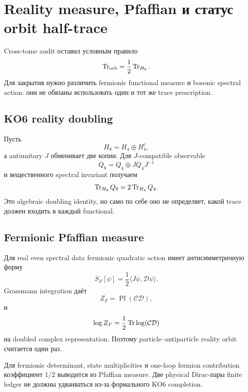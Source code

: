\chapter{Reality measure, Pfaffian и статус orbit half-trace}

Cross-tome audit оставил условным правило
\begin{equation}
 \operatorname{Tr}_{\mathrm{orb}}=\frac12\operatorname{Tr}_{H_8}.
\end{equation}
Для закрытия нужно различить fermionic functional measure и bosonic
spectral action: они не обязаны использовать один и тот же trace
prescription.

\section{KO6 reality doubling}

Пусть
\begin{equation}
 H_8=H_4\oplus H_4^c,
\end{equation}
а antiunitary \(J\) обменивает две копии. Для \(J\)-compatible observable
\begin{equation}
 Q_8=Q_4\oplus JQ_4J^{-1}
\end{equation}
и вещественного spectral invariant получаем
\begin{equation}
 \operatorname{Tr}_{H_8}Q_8=2\operatorname{Tr}_{H_4}Q_4.
\end{equation}
Это algebraic doubling identity, но само по себе оно не определяет,
какой trace должен входить в каждый functional.

\section{Fermionic Pfaffian measure}

Для real even spectral data fermionic quadratic action имеет
антисимметричную форму
\begin{equation}
 S_F[\psi]
 =
 \frac12\langle J\psi,\mathcal D\psi\rangle.
\end{equation}
Grassmann integration даёт
\begin{equation}
 Z_F=\operatorname{Pf}(\mathcal C\mathcal D),
\end{equation}
и
\begin{equation}
 \log Z_F
 =
 \frac12\operatorname{Tr}\log(\mathcal C\mathcal D)
\end{equation}
на doubled complex representation. Поэтому particle--antiparticle
reality orbit считается один раз.

\begin{theorem}
Для fermionic determinant, state multiplicities и one-loop fermion
contribution коэффициент \(1/2\) выводится из Pfaffian measure. Две
physical Dirac-пары finite ledger не должны удваиваться из-за формального
KO6 completion.
\end{theorem}

